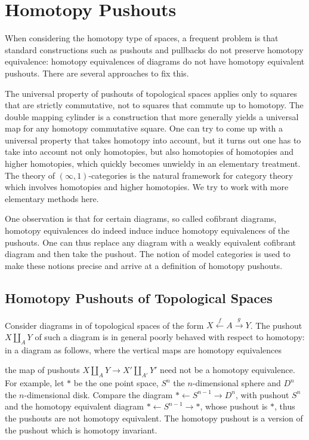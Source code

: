 \documentclass{scrartcl}
\theoremstyle{plain}
\theoremstyle{definition}
\newcommand{\from}{\leftarrow}
\let\xto\xrightarrow
\let\xfrom\xleftarrow
\renewcommand{\coprod}{\mathbin{\amalg}}
\begin{document}
\section{Homotopy Pushouts}

When considering the homotopy type of spaces, a frequent problem is that standard constructions such as pushouts and pullbacks do not preserve homotopy equivalence: homotopy equivalences of diagrams do not have homotopy equivalent pushouts. There are several approaches to fix this. 

The universal property of pushouts of topological spaces applies only to squares that are strictly commutative, not to squares that commute up to homotopy. The double mapping cylinder is a construction that more generally yields a universal map for any homotopy commutative square. One can try to come up with a universal property that takes homotopy into account, but it turns out one has to take into account not only homotopies, but also homotopies of homotopies and higher homotopies, which quickly becomes unwieldy in an elementary treatment. The theory of $(\infty, 1)$-categories is the natural framework for category theory which involves homotopies and higher homotopies. We try to work with more elementary methods here.

One observation is that for certain diagrams, so called cofibrant diagrams, homotopy equivalences do indeed induce induce homotopy equivalences of the pushouts. One can thus replace any diagram with a weakly equivalent cofibrant diagram and then take the pushout. The notion of model categories is used to make these notions precise and arrive at a definition of homotopy pushouts. 

\subsection{Homotopy Pushouts of Topological Spaces}\label{subsec:homotopy-pushouts-spaces}


Consider diagrams in of topological spaces of the form $X \xfrom{f} A \xto{g} Y$. The pushout $X\coprod_A Y$ of such a diagram is in general poorly behaved with respect to homotopy: in a diagram as follows, where the vertical maps are homotopy equivalences

\begin{center}
\end{center}
the map of pushouts $X\coprod_A Y \to X'\coprod_{A'} Y'$ need not be a homotopy equivalence. For example, let $*$ be the one point space, $S^n$ the $n$-dimensional sphere and $D^n$ the $n$-dimensional disk. Compare the diagram $*\from S^{n-1}\to D^n$, with pushout $S^n$ and the homotopy equivalent diagram $*\from S^{n-1}\to *$, whose pushout is $*$, thus the pushouts are not homotopy equivalent. The homotopy pushout is a version of the pushout which is homotopy invariant. 
\end{document}

